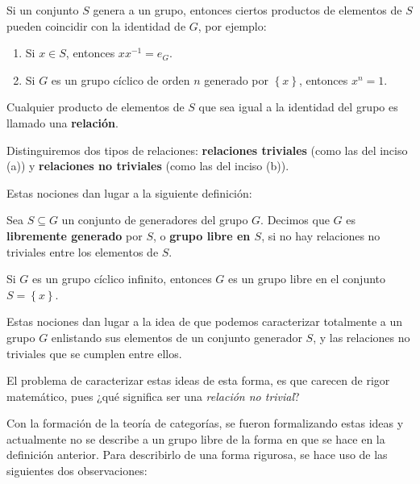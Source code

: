 \documentclass[12pt]{report}
\theoremstyle{largebreak}
\begin{document}
    Si un conjunto $S$ genera a un grupo, entonces ciertos productos de elementos de $S$ pueden coincidir con la identidad de $G$, por ejemplo:
    \renewcommand{\theenumi}{\alph{enumi}}
    \begin{enumerate}
        \item Si $x\in S$, entonces $xx^{-1}=e_G$.
        \item Si $G$ es un grupo cíclico de orden $n$ generado por $\left\{x\right\}$, entonces $x^n=1$.
    \end{enumerate}

    Cualquier producto de elementos de $S$ que sea igual a la identidad del grupo es llamado una \textbf{relación}.

    Distinguiremos dos tipos de relaciones: \textbf{relaciones triviales} (como las del inciso (a)) y \textbf{relaciones no triviales} (como las del inciso (b)).

    Estas nociones dan lugar a la siguiente definición:

    \begin{mydef}
        Sea $S\subseteq G$ un conjunto de generadores del grupo $G$. Decimos que $G$ es \textbf{libremente generado} por $S$, o \textbf{grupo libre en $S$}, si no hay relaciones no triviales entre los elementos de $S$.
    \end{mydef}

    \begin{exa}
        Si $G$ es un grupo cíclico infinito, entonces $G$ es un grupo libre en el conjunto $S=\left\{x \right\}$.
    \end{exa}

    Estas nociones dan lugar a la idea de que podemos caracterizar totalmente a un grupo $G$ enlistando sus elementos de un conjunto generador $S$, y las relaciones no triviales que se cumplen entre ellos.
    
    El problema de caracterizar estas ideas de esta forma, es que carecen de rigor matemático, pues ¿qué significa ser una \textit{relación no trivial}?

    Con la formación de la teoría de categorías, se fueron formalizando estas ideas y actualmente no se describe a un grupo libre de la forma en que se hace en la definición anterior. Para describirlo de una forma rigurosa, se hace uso de las siguientes dos observaciones:
\end{document}
